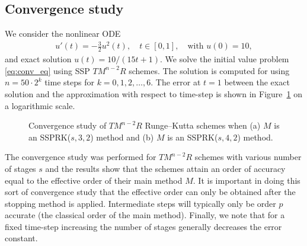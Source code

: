 \subsection{Convergence study}\label{subsec:convergence}
We consider the nonlinear ODE
\begin{align}\label{eq:conv_eq}
    u'(t) = -\frac{3}{2}u^{2}(t), \quad t \in [0,1], \quad \text{with } u(0) = 10,
\end{align}
and exact solution $u(t) = 10/(15t + 1)$.
We solve the initial value problem \eqref{eq:conv_eq}
using SSP $TM^{n-2}R$ schemes.
The solution is computed for using $n = 50 \cdot 2^{k}$ time steps for
$k = 0, 1, 2, \dots, 6$.
The error at $t=1$ between the exact solution and the approximation with 
respect to time-step is shown in Figure~\ref{fig:conv_study} on a logarithmic 
scale.
\begin{figure}
	\centering
   \quad
    \caption{Convergence study of $TM^{n-2}R$ Runge--Kutta schemes when (a) $M$
    is an SSPRK($s,3,2$) method and (b) $ M $ is an SSPRK($s,4,2$) method.}
    \label{fig:conv_study}
\end{figure}
The convergence study was performed for $TM^{n-2}R$ schemes with
various number of stages $s$ and the results show that the schemes
attain an order of accuracy equal to the effective order of their main
method $M$.
It is important in doing this sort of convergence study that the
effective order can only be obtained after the stopping method is
applied.
Intermediate steps will typically only be order $p$ accurate (the classical
order of the main method).
Finally, we note that for a fixed time-step increasing the number of stages
generally decreases the error constant.

